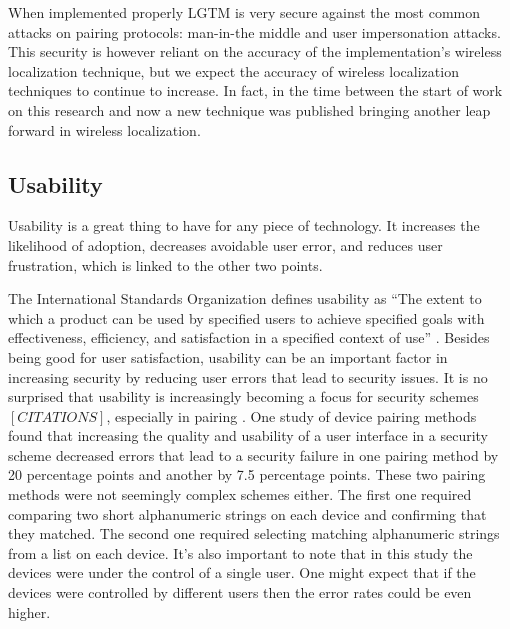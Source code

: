 \documentclass[12pt]{report}
\begin{document}
When implemented properly LGTM is very secure against the most common attacks on pairing protocols: man-in-the middle and user impersonation attacks. This security is however reliant on the accuracy of the implementation's wireless localization technique, but we expect the accuracy of wireless localization techniques to continue to increase. In fact, in the time between the start of work on this research and now a new technique was published \cite{ChronosSingleAPLocalizationVasisht2016} bringing another leap forward in wireless localization. \par


\subsection{Usability}
Usability is a great thing to have for any piece of technology. It increases the likelihood of adoption, decreases avoidable user error, and reduces user frustration, which is linked to the other two points. \par

The International Standards Organization defines usability as ``The extent to which a product can be used by specified users to achieve specified goals with effectiveness, efficiency, and satisfaction in a specified context of use'' \cite{UsabilityISO1998}. Besides being good for user satisfaction, usability can be an important factor in increasing security by reducing user errors that lead to security issues. It is no surprised that usability is increasingly becoming a focus for security schemes $[CITATIONS]$, especially in pairing \cite{UsabilitySecurityOutOfBandPairingKainda2009,UserPerceptionPairing,PlayfulPairingGallego2011,AliceMeetsBobKumar2009,SecurePairingUsabilityUzun2007,ConferenceCompStudySecurePairingKumar2009}. One study of device pairing methods \cite{SecurePairingUsabilityUzun2007} found that increasing the quality and usability of a user interface in a security scheme decreased errors that lead to a security failure in one pairing method by 20 percentage points and another by 7.5 percentage points. These two pairing methods were not seemingly complex schemes either. The first one required comparing two short alphanumeric strings on each device and confirming that they matched. The second one required selecting matching alphanumeric strings from a list on each device. It's also important to note that in this study the devices were under the control of a single user. One might expect that if the devices were controlled by different users then the error rates could be even higher. \par
\end{document}
